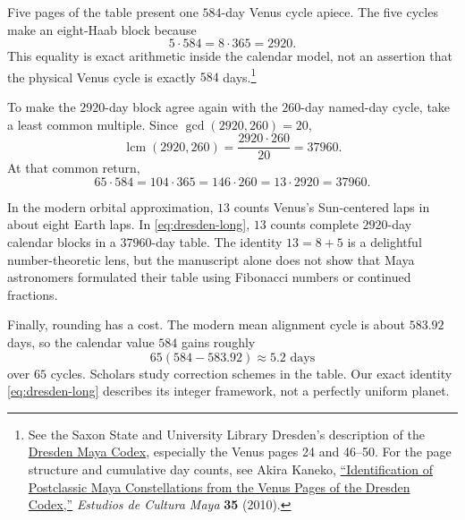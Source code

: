 Five pages of the table present one $584$-day Venus cycle apiece.  The five
cycles make an eight-Haab block because
\begin{equation}
  5\cdot584=8\cdot365=2920.                         \label{eq:dresden-block}
\end{equation}
This equality is exact arithmetic inside the calendar model, not an assertion
that the physical Venus cycle is exactly $584$ days.\footnote{See the Saxon
State and University Library Dresden's description of the
\href{https://www.slub-dresden.de/en/explore/manuscripts/the-dresden-maya-codex/content}{Dresden
Maya Codex}, especially the Venus pages 24 and 46--50.  For the page structure
and cumulative day counts, see Akira Kaneko,
\href{https://classic.scielo.org.mx/scielo.php?pid=S0185-25742010000100002&script=sci_arttext}{``Identification
of Postclassic Maya Constellations from the Venus Pages of the Dresden
Codex,''} \emph{Estudios de Cultura Maya} \textbf{35} (2010).}

To make the $2920$-day block agree again with the $260$-day named-day cycle,
take a least common multiple.  Since $\gcd(2920,260)=20$,
\[
  \operatorname{lcm}(2920,260)=\frac{2920\cdot260}{20}=37960.
\]
At that common return,
\begin{equation}
  65\cdot584=104\cdot365=146\cdot260
  =13\cdot2920=37960.                              \label{eq:dresden-long}
\end{equation}

\begin{labbox}[title={The same numbers are doing different jobs}]
In the modern orbital approximation, $13$ counts Venus's Sun-centered laps in
about eight Earth laps.  In \eqref{eq:dresden-long}, $13$ counts complete
$2920$-day calendar blocks in a $37960$-day table.  The identity $13=8+5$ is a
delightful number-theoretic lens, but the manuscript alone does not show that
Maya astronomers formulated their table using Fibonacci numbers or continued
fractions.
\end{labbox}

Finally, rounding has a cost.  The modern mean alignment cycle is about
$583.92$ days, so the calendar value $584$ gains roughly
\[
  65(584-583.92)\approx5.2\text{ days}
\]
over $65$ cycles.  Scholars study correction schemes in the table.  Our exact
identity \eqref{eq:dresden-long} describes its integer framework, not a
perfectly uniform planet.

